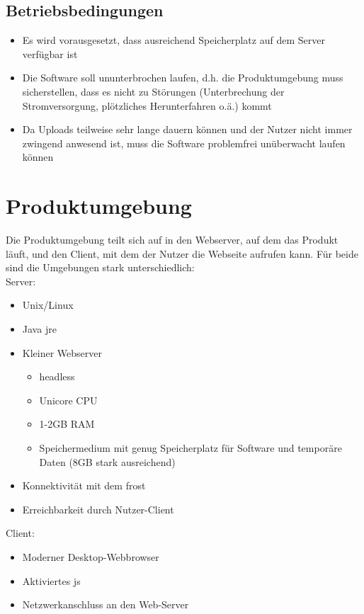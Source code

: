 \documentclass[a4paper, 12 pt]{article}
\begin{document}
\subsection{Betriebsbedingungen}
\begin{itemize}
	\item Es wird vorausgesetzt, dass ausreichend Speicherplatz auf dem Server verfügbar ist
	\item Die Software soll ununterbrochen laufen, d.h. die Produktumgebung muss sicherstellen, dass es nicht zu Störungen (Unterbrechung der Stromversorgung, plötzliches Herunterfahren o.ä.) kommt
	\item Da Uploads teilweise sehr lange dauern können und der Nutzer nicht immer zwingend anwesend ist, muss die Software problemfrei unüberwacht laufen können
\end{itemize}
	
\section{Produktumgebung}
Die Produktumgebung teilt sich auf in den Webserver, auf dem das Produkt läuft, und den Client, mit dem der Nutzer die Webseite aufrufen kann. Für beide sind die Umgebungen stark unterschiedlich: \\
Server:
\begin{itemize}
	\item Unix/Linux
	\item Java \gls{jre}
	\item Kleiner Webserver
	\begin{itemize}
		\item \gls{headless}
		\item Unicore CPU
		\item 1-2GB RAM
		\item Speichermedium mit genug Speicherplatz für Software und temporäre Daten (8GB stark ausreichend)
	\end{itemize}
	\item Konnektivität mit dem \gls{frost}
	\item Erreichbarkeit durch Nutzer-Client
\end{itemize}

\noindent Client:

\begin{itemize}
	\item Moderner Desktop-Webbrowser
	\item Aktiviertes \gls{js}
	\item Netzwerkanschluss an den Web-Server
\end{itemize}
\end{document}
